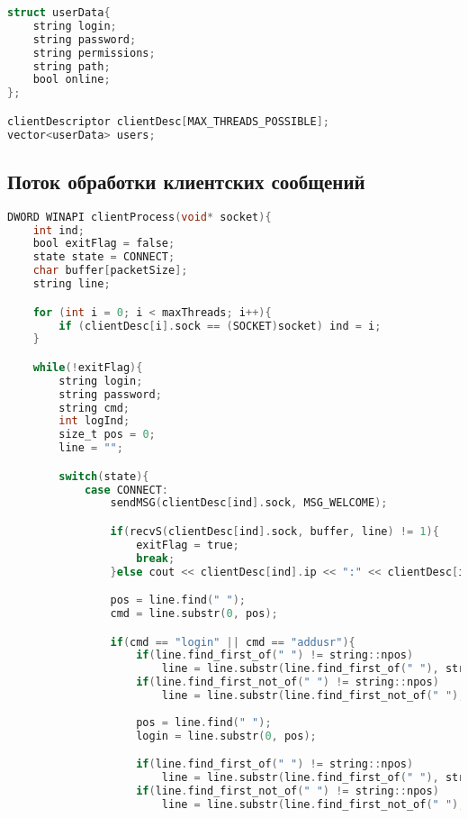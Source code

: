 \begin{append}
\begin{lstlisting}[language=C, label=lst:createserver]
struct userData{
    string login;
    string password;
    string permissions;
    string path;
    bool online;
};

clientDescriptor clientDesc[MAX_THREADS_POSSIBLE];
vector<userData> users;
\end{lstlisting}

\subsection{Поток обработки клиентских сообщений} \label{app:clientprocess}

\begin{lstlisting}[language=C, label=lst:createserver]
DWORD WINAPI clientProcess(void* socket){
    int ind;
    bool exitFlag = false;
    state state = CONNECT;
    char buffer[packetSize];
    string line;

    for (int i = 0; i < maxThreads; i++){
        if (clientDesc[i].sock == (SOCKET)socket) ind = i;
    }

    while(!exitFlag){
        string login;
        string password;
        string cmd;
        int logInd;
        size_t pos = 0;
        line = "";

        switch(state){
            case CONNECT:
                sendMSG(clientDesc[ind].sock, MSG_WELCOME);

                if(recvS(clientDesc[ind].sock, buffer, line) != 1){
                    exitFlag = true;
                    break;
                }else cout << clientDesc[ind].ip << ":" << clientDesc[ind].port << " " << line << endl;

                pos = line.find(" ");
                cmd = line.substr(0, pos);

                if(cmd == "login" || cmd == "addusr"){
                    if(line.find_first_of(" ") != string::npos)
                        line = line.substr(line.find_first_of(" "), string::npos);
                    if(line.find_first_not_of(" ") != string::npos)
                        line = line.substr(line.find_first_not_of(" "), string::npos);
                    
                    pos = line.find(" ");
                    login = line.substr(0, pos);

                    if(line.find_first_of(" ") != string::npos)
                        line = line.substr(line.find_first_of(" "), string::npos);
                    if(line.find_first_not_of(" ") != string::npos)
                        line = line.substr(line.find_first_not_of(" "), string::npos);


\end{lstlisting}
\end{append}
